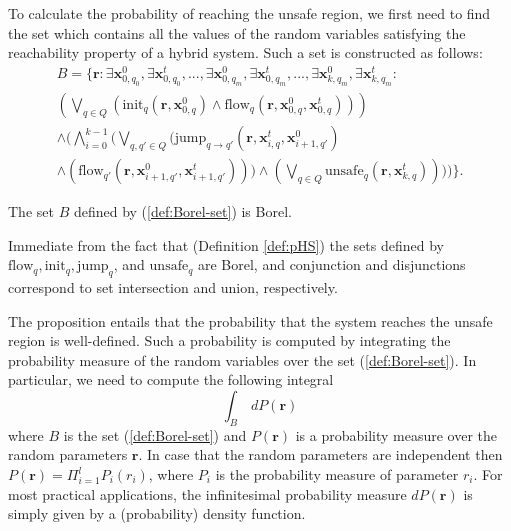 To calculate the probability of reaching the unsafe region, we first need to find the set 
which contains all the values of the random variables satisfying the reachability property 
of a hybrid system. Such a set is constructed as follows:
\begin{equation} \label{def:Borel-set}
\begin{split}
B = \{\textbf{r} : \exists \textbf{x}^{0}_{0,q_0}, \exists \textbf{x}^t_{0,q_0}, ... , \exists \textbf{x}^{0}_{0,q_m}, \exists \textbf{x}^t_{0,q_m} , ... , \exists \textbf{x}^{0}_{k,q_m}, \exists \textbf{x}^t_{k,q_m}\mathord{:}\\
(\bigvee_{q \in Q} (\text{init}_{q}(\textbf{r}, \textbf{x}^{0}_{0,q}) \wedge \text{flow}_{q}(\textbf{r}, \textbf{x}^{0}_{0,q},\textbf{x}^t_{0,q}))) \\
\wedge (\bigwedge_{i=0}^{k-1} (\bigvee_{q,q' \in Q}(\text{jump}_{q \rightarrow q'}(\textbf{r}, \textbf{x}^t_{i,q}, \textbf{x}^{0}_{i+1,q'}) \\
\wedge (\text{flow}_{q'}(\textbf{r}, \textbf{x}^{0}_{i+1,q'}, \textbf{x}^t_{i+1,q'}))) \wedge (\bigvee_{q \in Q} \text{unsafe}_{q}(\textbf{r}, \textbf{x}^t_{k,q}))))\}.
\end{split}
\end{equation}
\begin{proposition}
The set $B$ defined by (\ref{def:Borel-set}) is Borel.
\end{proposition}
\begin{IEEEproof}
Immediate from the fact that (Definition \ref{def:pHS}) the sets defined 
by $\text{flow}_q, \text{init}_q, \text{jump}_q$, and $\text{unsafe}_q$ are Borel, and conjunction and 
disjunctions correspond to set intersection and union, respectively.
\end{IEEEproof}

The proposition entails that the probability that the system reaches the unsafe region is well-defined. 
Such a probability is computed by integrating the probability measure of  the random variables over the 
set (\ref{def:Borel-set}). In particular, we need to compute the following integral
\begin{equation} \label{eq:probabilistic-reachability}
\int_{B} \,dP(\textbf{r})
\end{equation}
where $B$ is the set (\ref{def:Borel-set}) and $P(\textbf{r})$ is a probability measure over 
the random parameters $\textbf{r}$. In case that the random parameters are independent then 
$P(\textbf{r}) = \Pi_{i=1}^{l} P_i(r_{i})$, where $P_i$ is the probability measure of 
parameter $r_i$. For most practical applications, the infinitesimal probability measure 
$dP(\textbf{r})$ is simply given by a (probability) density function.


